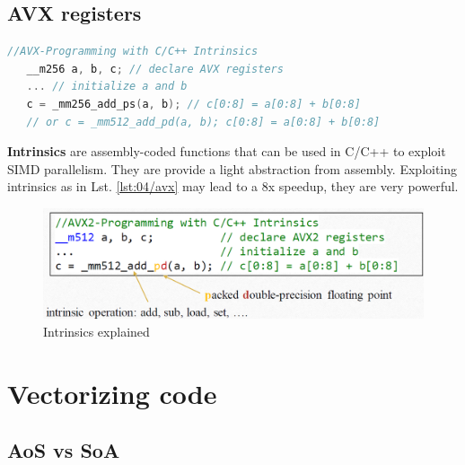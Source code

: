 \subsection{AVX registers}

\begin{lstlisting}[language=C,label={lst:04/avx},caption={Intrinsics}]
   //AVX-Programming with C/C++ Intrinsics
   __m256 a, b, c; // declare AVX registers
   ... // initialize a and b
   c = _mm256_add_ps(a, b); // c[0:8] = a[0:8] + b[0:8]
   // or c = _mm512_add_pd(a, b); c[0:8] = a[0:8] + b[0:8]
\end{lstlisting}

\textbf{Intrinsics} are assembly-coded functions that can be used in C/C++ to exploit SIMD parallelism. They are provide a light abstraction from assembly.
Exploiting intrinsics as in Lst. \ref{lst:04/avx} may lead to a 8x speedup, they are very powerful.

\begin{figure}[htbp]
   \centering
   \includegraphics{images/04/intrinsics.png}
   \caption{Intrinsics explained}
   \label{fig:04/intrinsics}
\end{figure}

\section{Vectorizing code}
\subsection{AoS vs SoA}

